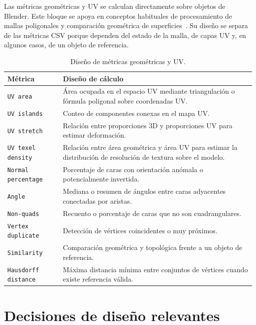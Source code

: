 Las métricas geométricas y UV se calculan directamente sobre objetos de Blender. Este bloque se apoya en conceptos habituales de procesamiento de mallas poligonales y comparación geométrica de superficies~\cite{botsch2010polygon,cignoni1998metro}. Su diseño se separa de las métricas CSV porque dependen del estado de la malla, de capas UV y, en algunos casos, de un objeto de referencia.

\begin{table}[H]
\centering
\scriptsize
\renewcommand{\arraystretch}{1.15}
\begin{tabularx}{\textwidth}{p{3.2cm}X}
\toprule
\textbf{Métrica} & \textbf{Diseño de cálculo} \\
\midrule
\texttt{UV area} & Área ocupada en el espacio UV mediante triangulación o fórmula poligonal sobre coordenadas UV. \\
\texttt{UV islands} & Conteo de componentes conexas en el mapa UV. \\
\texttt{UV stretch} & Relación entre proporciones 3D y proporciones UV para estimar deformación. \\
\texttt{UV texel density} & Relación entre área geométrica y área UV para estimar la distribución de resolución de textura sobre el modelo. \\
\texttt{Normal percentage} & Porcentaje de caras con orientación anómala o potencialmente invertida. \\
\texttt{Angle} & Mediana o resumen de ángulos entre caras adyacentes conectadas por aristas. \\
\texttt{Non-quads} & Recuento o porcentaje de caras que no son cuadrangulares. \\
\texttt{Vertex duplicate} & Detección de vértices coincidentes o muy próximos. \\
\texttt{Similarity} & Comparación geométrica y topológica frente a un objeto de referencia. \\
\texttt{Hausdorff distance} & Máxima distancia mínima entre conjuntos de vértices cuando existe referencia válida. \\
\bottomrule
\end{tabularx}
\caption{Diseño de métricas geométricas y UV.}
\label{tab:c-diseno-geom-uv}
\end{table}

\section{Decisiones de diseño relevantes}
\label{sec:c-decisiones-diseno}


